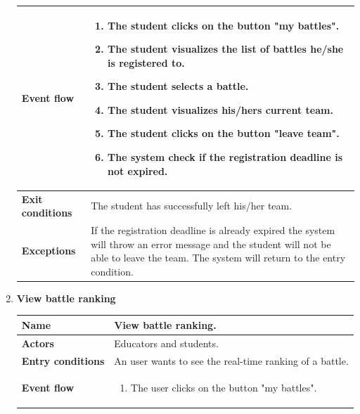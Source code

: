 \begin{enumerate}[label=\textbf{UC.\arabic*}]
\begin{table}[H]
\begin{tabular}{|m{3.2cm}|m{9.8cm}|}
                    \textbf{Event flow}  & 
                    \begin{enumerate}[label=\arabic*.]
                        \item The student clicks on the button "my battles".
                        \item The student visualizes the list of battles he/she is registered to.
                        \item The student selects a battle.
                        \item The student visualizes his/hers current team.
                         \item The student clicks on the button "leave team".
                        \item The system check if the registration deadline is not expired.
                    \end{enumerate}\\ 
                    \hline
                    \textbf{Exit conditions}  & The student has successfully left his/her team. \\
                    \hline
                    \textbf{Exceptions}  & If the registration deadline is already expired the system will throw an error message and the student will not be able to leave the team. The system will return to the entry condition. \\
                    \hline 
                \end{tabular}
        \end{table}
        \item {} \textbf{View battle ranking}
        \begin{table}[H]
    	    \centering
                \renewcommand{\arraystretch}{1.5}
                \begin{tabular}{|m{3.2cm}|m{9.8cm}|}
                    \hline
                    \textbf{Name} & View battle ranking. \\
                    \hline
                    \textbf{Actors} & Educators and students. \\
                    \hline
                    \textbf{Entry conditions}  & An user wants to see the real-time ranking of a battle. \\
                    \hline
                    \textbf{Event flow}  & 
                    \begin{enumerate}[label=\arabic*.]
                        \item The user clicks on the button "my battles".

\end{enumerate}
\end{tabular}
\end{table}
\end{enumerate}
